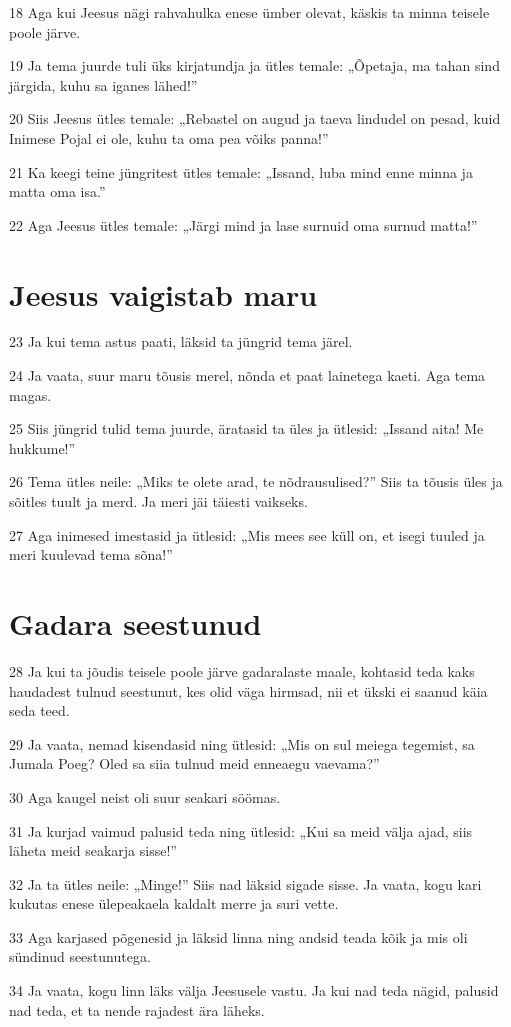 \par 18 Aga kui Jeesus nägi rahvahulka enese ümber olevat, käskis ta minna teisele poole järve.
\par 19 Ja tema juurde tuli üks kirjatundja ja ütles temale: „Õpetaja, ma tahan sind järgida, kuhu sa iganes lähed!”
\par 20 Siis Jeesus ütles temale: „Rebastel on augud ja taeva lindudel on pesad, kuid Inimese Pojal ei ole, kuhu ta oma pea võiks panna!”
\par 21 Ka keegi teine jüngritest ütles temale: „Issand, luba mind enne minna ja matta oma isa.”
\par 22 Aga Jeesus ütles temale: „Järgi mind ja lase surnuid oma surnud matta!”

\section*{Jeesus vaigistab maru}

\par 23 Ja kui tema astus paati, läksid ta jüngrid tema järel.
\par 24 Ja vaata, suur maru tõusis merel, nõnda et paat lainetega kaeti. Aga tema magas.
\par 25 Siis jüngrid tulid tema juurde, äratasid ta üles ja ütlesid: „Issand aita! Me hukkume!”
\par 26 Tema ütles neile: „Miks te olete arad, te nõdrausulised?” Siis ta tõusis üles ja sõitles tuult ja merd. Ja meri jäi täiesti vaikseks.
\par 27 Aga inimesed imestasid ja ütlesid: „Mis mees see küll on, et isegi tuuled ja meri kuulevad tema sõna!”

\section*{Gadara seestunud}

\par 28 Ja kui ta jõudis teisele poole järve gadaralaste maale, kohtasid teda kaks haudadest tulnud seestunut, kes olid väga hirmsad, nii et ükski ei saanud käia seda teed.
\par 29 Ja vaata, nemad kisendasid ning ütlesid: „Mis on sul meiega tegemist, sa Jumala Poeg? Oled sa siia tulnud meid enneaegu vaevama?”
\par 30 Aga kaugel neist oli suur seakari söömas.
\par 31 Ja kurjad vaimud palusid teda ning ütlesid: „Kui sa meid välja ajad, siis läheta meid seakarja sisse!”
\par 32 Ja ta ütles neile: „Minge!” Siis nad läksid sigade sisse. Ja vaata, kogu kari kukutas enese ülepeakaela kaldalt merre ja suri vette.
\par 33 Aga karjased põgenesid ja läksid linna ning andsid teada kõik ja mis oli sündinud seestunutega.
\par 34 Ja vaata, kogu linn läks välja Jeesusele vastu. Ja kui nad teda nägid, palusid nad teda, et ta nende rajadest ära läheks.


